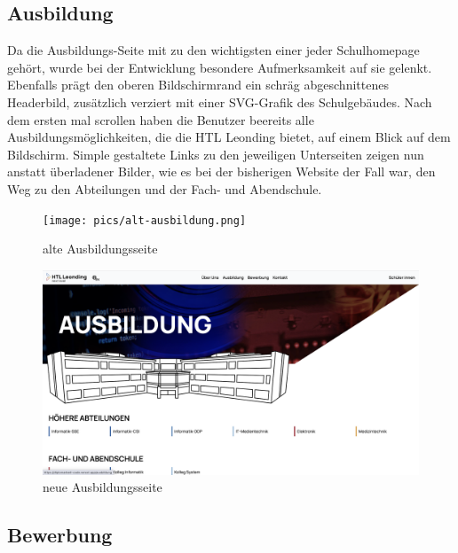 \subsection{Ausbildung}

Da die Ausbildungs-Seite mit zu den wichtigsten einer jeder Schulhomepage gehört, wurde bei der Entwicklung besondere Aufmerksamkeit auf sie gelenkt.
Ebenfalls prägt den oberen Bildschirmrand ein schräg abgeschnittenes Headerbild, zusätzlich verziert mit einer SVG-Grafik des Schulgebäudes.
Nach dem ersten mal scrollen haben die Benutzer beereits alle Ausbildungsmöglichkeiten, die die HTL Leonding bietet, auf einem Blick auf dem Bildschirm.
Simple gestaltete Links zu den jeweiligen Unterseiten zeigen nun anstatt überladener Bilder, wie es bei der bisherigen Website der Fall war, den 
Weg zu den Abteilungen und der Fach- und Abendschule.

\begin{figure}
   \begin{minipage}[b]{.4\linewidth} 
      \texttt{[image: pics/alt-ausbildung.png]}
      \caption{alte Ausbildungsseite}
      \label{fig:impl:alt:ausbildung}
   \end{minipage}
   \hspace{.05\linewidth}
   \begin{minipage}[b]{.4\linewidth}
      \includegraphics[width=\linewidth]{pics/neu-ausbildung.png}
      \caption{neue Ausbildungsseite}
      \label{fig:impl:neu:ausbildung}
   \end{minipage}
\end{figure}


\subsection{Bewerbung}

